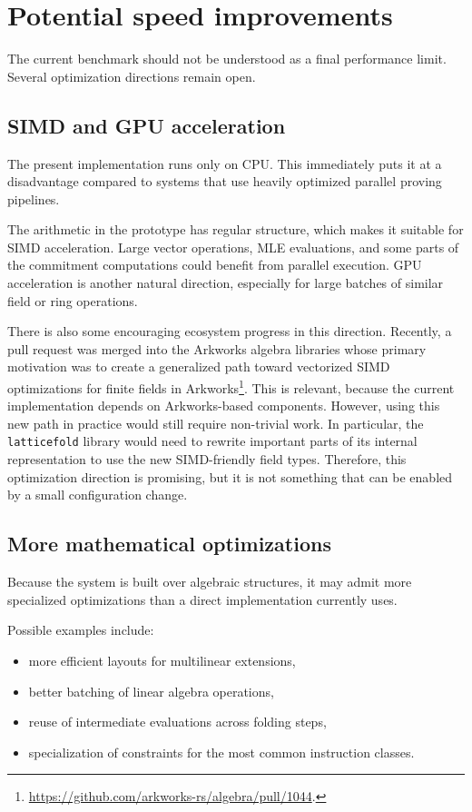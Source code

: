 \section{Potential speed improvements}

The current benchmark should not be understood as a final performance limit.
Several optimization directions remain open.

\subsection{SIMD and GPU acceleration}

The present implementation runs only on CPU. This immediately puts it at a
disadvantage compared to systems that use heavily optimized parallel proving
pipelines.

The arithmetic in the prototype has regular structure, which makes it suitable
for SIMD acceleration. Large vector operations, MLE evaluations, and some parts
of the commitment computations could benefit from parallel execution.
GPU acceleration is another natural direction, especially for large batches of
similar field or ring operations.

There is also some encouraging ecosystem progress in this direction. Recently,
a pull request was merged into the Arkworks algebra libraries whose primary
motivation was to create a generalized path toward vectorized SIMD
optimizations for finite fields in Arkworks\footnote{\url{https://github.com/arkworks-rs/algebra/pull/1044}.}.
This is relevant, because the current implementation depends on Arkworks-based components.
However, using this new path in practice would still require non-trivial work.
In particular, the \texttt{latticefold} library would need to rewrite important
parts of its internal representation to use the new SIMD-friendly field types.
Therefore, this optimization direction is promising, but it is not something
that can be enabled by a small configuration change.

\subsection{More mathematical optimizations}

Because the system is built over algebraic structures, it may admit more
specialized optimizations than a direct implementation currently uses.

Possible examples include:

\begin{itemize}
	\item more efficient layouts for multilinear extensions,
	\item better batching of linear algebra operations,
	\item reuse of intermediate evaluations across folding steps,
	\item specialization of constraints for the most common instruction classes.
\end{itemize}

